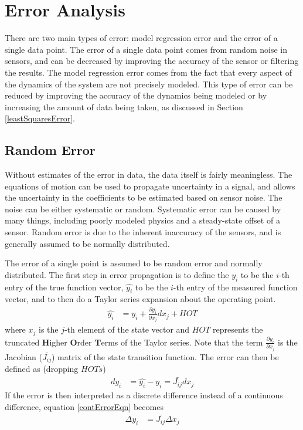 \chapter{Error Analysis}
There are two main types of error: model regression error and the error of a single data point. The error of a single data point comes from random noise in sensors, and can be decreased by improving the accuracy of the sensor or filtering the results. The model regression error comes from the fact that every aspect of the dynamics of the system are not precisely modeled. This type of error can be reduced by improving the accuracy of the dynamics being modeled or by increasing the amount of data being taken, as discussed in Section \ref{leastSquaresError}.
\section{Random Error}
\label{pointErrorSection}
Without estimates of the error in data, the data itself is fairly meaningless. The equations of motion can be used to propagate uncertainty in a signal, and allows the uncertainty in the coefficients to be estimated based on sensor noise. The noise can be either systematic or random. Systematic error can be caused by many things, including poorly modeled physics and a steady-state offset of a sensor. Random error is due to the inherent inaccuracy of the sensors, and is generally assumed to be normally distributed.

The error of a single point is assumed to be random error and normally distributed. The first step in error propagation is to define the $y_i$ to be the $i$-th entry of the true function vector, $\hat{y_i}$ to be the $i$-th entry of the measured function vector, and to then do a Taylor series expansion about the operating point.
\begin{align}
\hat{y_i} &= y_i + \frac{\partial{y_i}}{\partial{x_j}}dx_j+HOT
\end{align}
where $x_j$ is the $j$-th element of the state vector and $HOT$ represents the truncated  \textbf{H}igher \textbf{O}rder \textbf{T}erms of the Taylor series. Note that the term $\frac{\partial{y_i}}{\partial{x_j}}$ is the Jacobian ($\bar{J_{ij}}$) matrix of the state transition function. The error can then be defined as (dropping $HOTs$)
\begin{align}
\label{contErrorEqn}
dy_i &= \hat{y_i}-y_i =  \bar{J_{ij}}dx_j
\end{align}
If the error is then interpreted as a discrete difference instead of a continuous difference, equation \ref{contErrorEqn} becomes
\begin{align}
\label{errorEqn}
\Delta y_i &= \bar{J_{ij}}\Delta x_j
\end{align}

